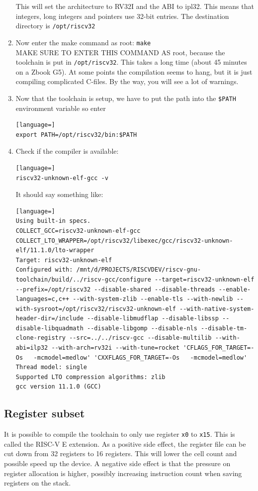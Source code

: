 \documentclass[12pt]{article}
\begin{document}
\begin{enumerate}
This will set the architecture to RV32I and the ABI to ipl32. This means that integers, long integers and pointers use 32-bit entries. The destination directory is \lstinline|/opt/riscv32|
\item Now enter the make command as root: \lstinline|make|\\
MAKE SURE TO ENTER THIS COMMAND AS root, because the toolchain is put in \lstinline|/opt/riscv32|. This takes a long time (about 45 minutes on a Zbook G5). At some points the compilation seems to hang, but it is just compiling complicated C-files. By the way, you will see a lot of warnings.
\item Now that the toolchain is setup, we have to put the path into the \lstinline|$PATH| environment variable so enter
\begin{lstlisting}[language=]
export PATH=/opt/riscv32/bin:$PATH
\end{lstlisting}
\item Check if the compiler is available:
\begin{lstlisting}[language=]
riscv32-unknown-elf-gcc -v
\end{lstlisting}
It should say something like:
\begin{lstlisting}[language=]
Using built-in specs.
COLLECT_GCC=riscv32-unknown-elf-gcc
COLLECT_LTO_WRAPPER=/opt/riscv32/libexec/gcc/riscv32-unknown-elf/11.1.0/lto-wrapper
Target: riscv32-unknown-elf
Configured with: /mnt/d/PROJECTS/RISCVDEV/riscv-gnu-toolchain/build/../riscv-gcc/configure --target=riscv32-unknown-elf --prefix=/opt/riscv32 --disable-shared --disable-threads --enable-languages=c,c++ --with-system-zlib --enable-tls --with-newlib --with-sysroot=/opt/riscv32/riscv32-unknown-elf --with-native-system-header-dir=/include --disable-libmudflap --disable-libssp --disable-libquadmath --disable-libgomp --disable-nls --disable-tm-clone-registry --src=../../riscv-gcc --disable-multilib --with-abi=ilp32 --with-arch=rv32i --with-tune=rocket 'CFLAGS_FOR_TARGET=-Os   -mcmodel=medlow' 'CXXFLAGS_FOR_TARGET=-Os   -mcmodel=medlow'
Thread model: single
Supported LTO compression algorithms: zlib
gcc version 11.1.0 (GCC) 
\end{lstlisting}
\end{enumerate}

\subsection{Register subset}
It is possible to compile the toolchain to only use register \texttt{x0} to \texttt{x15}. This is called the RISC-V E extension. As a positive side effect, the register file can be cut down from 32 registers to 16 registers. This will lower the cell count and possible speed up the device. A negative side effect is that the pressure on register allocation is higher, possibly increasing instruction count when saving registers on the stack.
\end{document}
